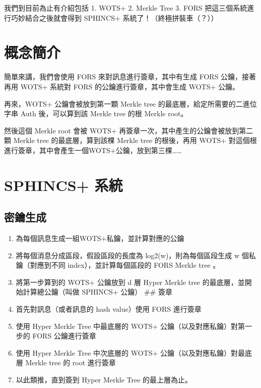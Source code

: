 \documentclass[
]{article}
\author{}
\date{}
\providecommand{\tightlist}{%
  \setlength{\itemsep}{0pt}\setlength{\parskip}{0pt}}
\begin{document}
我們到目前為止有介紹包括 1. WOTS+ 2. Merkle Tree 3. FORS
把這三個系統進行巧妙結合之後就會得到 SPHINCS+
系統了！（終極拼裝車（？））

\hypertarget{ux6982ux5ff5ux7c21ux4ecb}{%
\section{概念簡介}\label{ux6982ux5ff5ux7c21ux4ecb}}

簡單來講，我們會使用 FORS 來對訊息進行簽章，其中有生成 FORS
公鑰，接著再用 WOTS+ 系統對 FORS 的公鑰進行簽章，其中會生成 WOTS+ 公鑰。

再來，WOTS+ 公鑰會被放到第一顆 Merkle tree
的最底層，給定所需要的二進位字串 Auth 後，可以算到該 Merkle tree 的根
Merkle root。

然後這個 Merkle root 會被 WOTS+ 再簽章一次，其中產生的公鑰會被放到第二顆
Merkle tree 的最底層，算到該棵 Merkle tree 的根後，再用 WOTS+
對這個根進行簽章，其中會產生一個WOTS+公鑰，放到第三棵\ldots\ldots{}

\hypertarget{sphincs-ux7cfbux7d71}{%
\section{SPHINCS+ 系統}\label{sphincs-ux7cfbux7d71}}

\hypertarget{ux5bc6ux9470ux751fux6210}{%
\subsection{密鑰生成}\label{ux5bc6ux9470ux751fux6210}}

\begin{enumerate}
\def\labelenumi{\arabic{enumi}.}
\tightlist
\item
  為每個訊息生成一組WOTS+私鑰，並計算對應的公鑰
\item
  將每個消息分成區段，假設區段的長度為 log2(w)，則為每個區段生成 w
  個私鑰（對應到不同 index），並計算每個區段的 FORS Merkle tree 。
\item
  將第一步算到的 WOTS+ 公鑰放到 d 層 Hyper Merkle tree
  的最底層，並開始計算總公鑰（叫做 SPHINCS+ 公鑰） \#\# 簽章
\item
  首先對訊息（或者訊息的 hash value）使用 FORS 進行簽章
\item
  使用 Hyper Merkle Tree 中最底層的 WOTS+ 公鑰（以及對應私鑰）對第一步的
  FORS 公鑰進行簽章
\item
  使用 Hyper Merkle Tree 中次底層的 WOTS+ 公鑰（以及對應私鑰）對最底層
  Merkle tree 的 root 進行簽章
\item
  以此類推，直到簽到 Hyper Merkle Tree 的最上層為止。
\end{enumerate}
\end{document}
